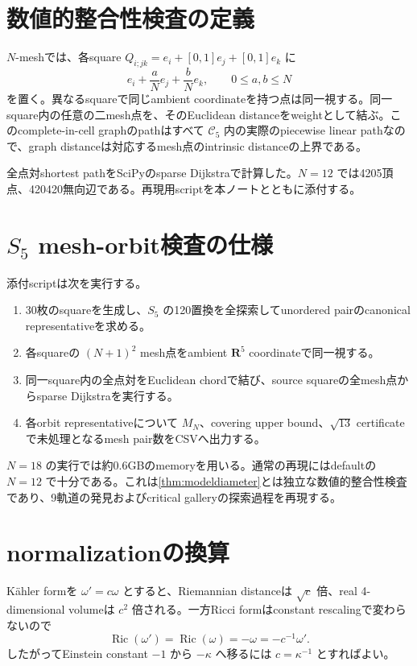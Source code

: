 \documentclass[11pt,a4paper]{ltjsarticle}
\theoremstyle{definition}
\theoremstyle{remark}
\newcommand{\RR}{\mathbf R}
\newcommand{\cC}{\mathcal C}
\newcommand{\Ric}{\operatorname{Ric}}
\begin{document}
\section{数値的整合性検査の定義}

$N$-meshでは、各square $Q_{i;jk}=e_i+[0,1]e_j+[0,1]e_k$ に
\[
 e_i+\frac aN e_j+\frac bN e_k,
 \qquad 0\leq a,b\leq N
\]
を置く。異なるsquareで同じambient coordinateを持つ点は同一視する。同一square内の任意の二mesh点を、そのEuclidean distanceをweightとして結ぶ。このcomplete-in-cell graphのpathはすべて $\cC_5$ 内の実際のpiecewise linear pathなので、graph distanceは対応するmesh点のintrinsic distanceの上界である。

全点対shortest pathをSciPyのsparse Dijkstraで計算した。$N=12$ では4205頂点、420420無向辺である。再現用scriptを本ノートとともに添付する。


\section{$S_5$ mesh-orbit検査の仕様}

添付scriptは次を実行する。
\begin{enumerate}[leftmargin=2.5em]
\item 30枚のsquareを生成し、$S_5$ の120置換を全探索してunordered pairのcanonical representativeを求める。
\item 各squareの $(N+1)^2$ mesh点をambient $\RR^5$ coordinateで同一視する。
\item 同一square内の全点対をEuclidean chordで結び、source squareの全mesh点からsparse Dijkstraを実行する。
\item 各orbit representativeについて $M_N$、covering upper bound、$\sqrt{13}$ certificateで未処理となるmesh pair数をCSVへ出力する。
\end{enumerate}
$N=18$ の実行では約0.6GBのmemoryを用いる。通常の再現にはdefaultの $N=12$ で十分である。これは\cref{thm:modeldiameter}とは独立な数値的整合性検査であり、9軌道の発見およびcritical galleryの探索過程を再現する。


\section{normalizationの換算}

Kähler formを $\omega'=c\omega$ とすると、Riemannian distanceは $\sqrt c$ 倍、real 4-dimensional volumeは $c^2$ 倍される。一方Ricci formはconstant rescalingで変わらないので
\[
 \Ric(\omega')=\Ric(\omega)=-\omega=-c^{-1}\omega'.
\]
したがってEinstein constant $-1$ から $-\kappa$ へ移るには $c=\kappa^{-1}$ とすればよい。
\end{document}
